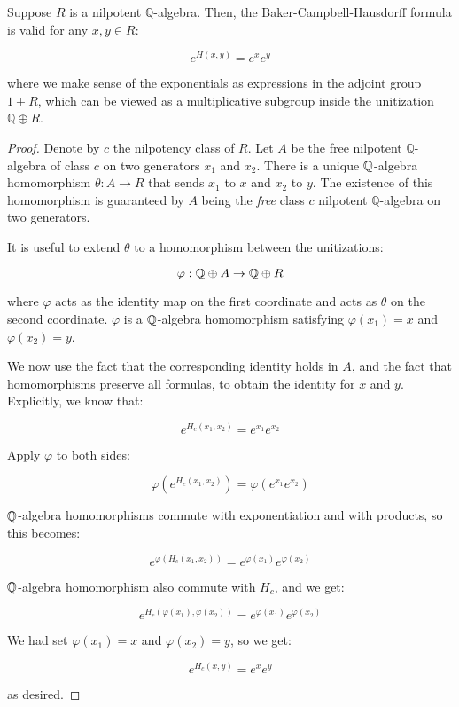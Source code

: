 \begin{theorem}\label{thm:bch-universal-validity-rationals}
  Suppose $R$ is a nilpotent $\mathbb{Q}$-algebra. Then, the
  Baker-Campbell-Hausdorff formula is valid for any $x,y \in R$:

  $$e^{H(x,y)} = e^xe^y$$

  where we make sense of the exponentials as expressions in the
  adjoint group $1 + R$, which can be viewed as a multiplicative
  subgroup inside the unitization $\mathbb{Q} \oplus R$.
\end{theorem}

\begin{proof}
  Denote by $c$ the nilpotency class of $R$. Let $A$ be the free
  nilpotent $\mathbb{Q}$-algebra of class $c$ on two generators $x_1$
  and $x_2$. There is a unique $\mathbb{Q}$-algebra homomorphism $\theta:A
  \to R$ that sends $x_1$ to $x$ and $x_2$ to
  $y$. The existence of this homomorphism is guaranteed by $A$ being
  the {\em free} class $c$ nilpotent $\mathbb{Q}$-algebra on two
  generators.

  It is useful to extend $\theta$ to a homomorphism between the unitizations:

  $$\varphi: \mathbb{Q} \oplus A \to \mathbb{Q} \oplus R$$

  where $\varphi$ acts as the identity map on the first coordinate and
  acts as $\theta$ on the second coordinate. $\varphi$ is a
  $\mathbb{Q}$-algebra homomorphism satisfying $\varphi(x_1) = x$ and
  $\varphi(x_2) = y$.
  
  We now use the fact that the corresponding identity holds in $A$,
  and the fact that homomorphisms preserve all formulas, to obtain the
  identity for $x$ and $y$. Explicitly, we know that:

  $$e^{H_c(x_1,x_2)} = e^{x_1}e^{x_2}$$

  Apply $\varphi$ to both sides:
  
  $$\varphi(e^{H_c(x_1,x_2)}) = \varphi(e^{x_1}e^{x_2})$$

  $\mathbb{Q}$-algebra homomorphisms commute with exponentiation and with
  products, so this becomes:
  
  $$e^{\varphi(H_c(x_1,x_2))} = e^{\varphi(x_1)}e^{\varphi(x_2)}$$
  
  $\mathbb{Q}$-algebra homomorphism also commute with $H_c$, and we get:
  
  $$e^{H_c(\varphi(x_1),\varphi(x_2))} = e^{\varphi(x_1)}e^{\varphi(x_2)}$$
  
  We had set $\varphi(x_1) = x$ and $\varphi(x_2) = y$, so we get:
  
  $$e^{H_c(x,y)} = e^xe^y$$

  as desired.
\end{proof}

